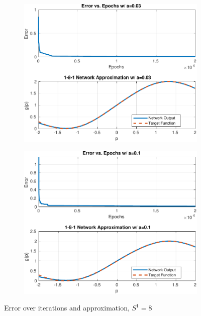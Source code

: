 \begin{figure}[htpb]
	\vspace{1cm}
	\begin{subfigure}{0.47\textwidth}
		\centering
		\includegraphics[width=\textwidth]{../Problem 4/nn_images/1-8-1_NN_a=0.03.pdf}
		\caption{}
	\end{subfigure}
	\hfill
	\begin{subfigure}{0.47\textwidth}
		\centering
		\includegraphics[width=\textwidth]{../Problem 4/nn_images/1-8-1_NN_a=0.1.pdf}
		\caption{}
	\end{subfigure}
	\caption{Error over iterations and approximation, $S^1=8$}
	\label{fig:prob4_1-8-1_error_output}
\end{figure}


